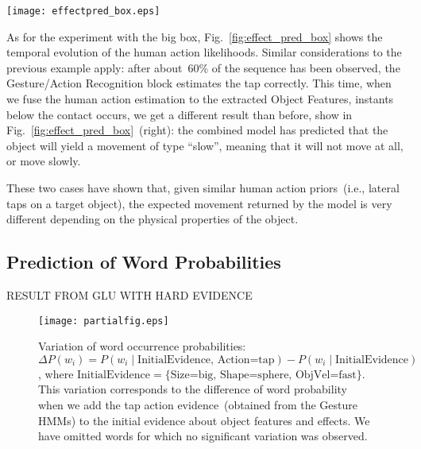\begin{figure*}
  \quad
  \texttt{[image: effectpred\_box.eps]}
  \caption{Object velocity predictions on a big box, given probabilistic human action information from Gesture \acp{HMM}.}
  \label{fig:effect_pred_box}
\end{figure*}

As for the experiment with the big box, Fig.~\ref{fig:effect_pred_box} shows the temporal evolution of the human action likelihoods.
Similar considerations to the previous example apply: after about~$60$\% of the sequence has been observed, the Gesture/Action Recognition block estimates the tap correctly.
This time, when we fuse the human action estimation to the extracted Object Features, instants below the contact occurs, we get a different result than before, show in Fig.~\ref{fig:effect_pred_box}~(right): the combined model has predicted that the object will yield a movement of type ``slow'', meaning that it will not move at all, or move slowly.

These two cases have shown that, given similar human action priors~(i.e., lateral taps on a target object), the expected movement returned by the model is very different depending on the physical properties of the object.

\subsection{Prediction of Word Probabilities}

RESULT FROM GLU WITH HARD EVIDENCE

\begin{figure}
\centering
\texttt{[image: partialfig.eps]}
\caption{Variation of word occurrence probabilities:
$\Delta P(w_i) = P(w_i \mid \text{InitialEvidence, Action=tap}) - P(w_i \mid \text{InitialEvidence})$, where $\text{InitialEvidence} = \{ \text{Size=big, Shape=sphere, ObjVel=fast} \}$.
This variation corresponds to the difference of word probability when we add the tap action evidence~(obtained from the Gesture \acp{HMM}) to the initial evidence about object features and effects. We have omitted words for which no significant variation was observed.}
\label{fig:probdiff}
\end{figure}

